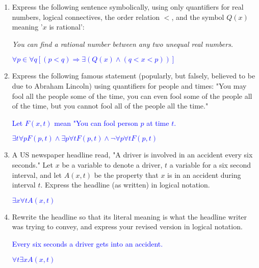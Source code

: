 \documentclass[13.5pt]{article}
\begin{document}
\begin{enumerate}
\item{Express the following sentence symbolically, using only quantifiers for real numbers, logical connectives, the order relation \(<\), and the symbol \(Q(x)\) meaning '\(x\) is rational': }
\begin{center}
\textit{You can find a rational number between any two unequal real numbers.}
\end{center}

\begin{center}
\textcolor{blue} { \(\forall p\in \forall q[(p<q)\Rightarrow\exists (Q(x)\wedge(q<x<p))]\)}
\end{center}

\item{Express the following famous statement (popularly, but falsely, believed to be due to Abraham Lincoln) using quantifiers for people and times: "You may fool all the people some of the time, you can even fool some of the people all of the time, but you cannot fool all of the people all the time." }

\textcolor{blue} {Let \(F(x,t)\) mean "You can fool person \(p\) at time \(t\). }\

\textcolor{blue} {\(\exists t \forall p F(p,t) \wedge \exists p \forall t F(p,t)\wedge \neg \forall p \forall t F(p,t)\)}

\item{ A US newspaper headline read, "A driver is involved in an accident every six seconds." Let \(x\) be a variable to denote a driver, \(t\) a variable for a six second interval, and let \(A(x,t)\) be the property that \(x\) is in an accident during interval \(t\). Express the headline (as written) in logical notation. }

\textcolor{blue} {\(\exists x \forall t A(x,t)\)}

\item{Rewrite the headline so that its literal meaning is what the headline writer was trying to convey, and express your revised version in logical notation.}

\textcolor{blue} {Every six seconds a driver gets into an accident. }\

\textcolor{blue} {\(\forall t \exists x A(x,t)\)}


\end{enumerate}
\end{document}
